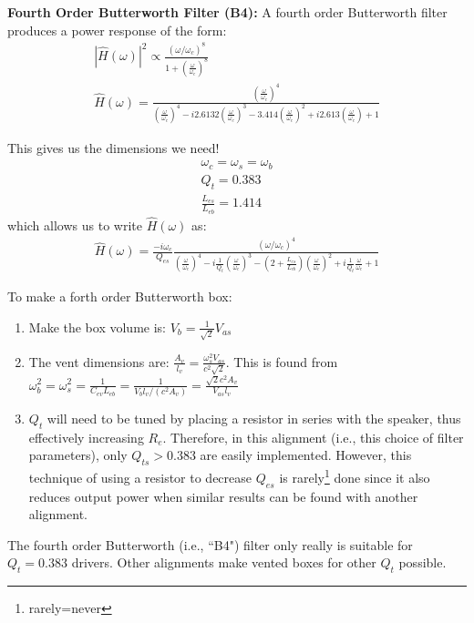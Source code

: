 \documentclass[10pt,letterpaper]{book}
\begin{document}
\textbf{Fourth Order Butterworth Filter (B4):} A fourth order Butterworth filter produces a power response of the form:
\begin{align}
\left|  \hat{H}(\omega) \right|^2\propto \frac{(\omega/\omega_c)^8}{1+\left(\frac{\omega}{\omega_c}\right)^8}\label{eq:transfer_func}\\
\hat{H}(\omega)=\frac{(\frac{\omega}{\omega_c})^4}{(\frac{\omega}{\omega_c})^4-i2.6132(\frac{\omega}{\omega_c})^3-3.414(\frac{\omega}{\omega_c})^2+i2.613(\frac{\omega}{\omega_c})+1}
\end{align}

This gives us the dimensions we need!
\begin{align}
\omega_c=\omega_s=\omega_b\\
Q_t=0.383\\
\frac{L_{es}}{L_{eb}}=1.414
\end{align}
which allows us to write $\hat{H}(\omega)$ as:
\begin{align}
\hat{H}(\omega)=\frac{-i\omega_c}{Q_{es}}\frac{(\omega/\omega_c)^4}
{\left(\frac{\omega}{\omega_c}\right)^4-i\frac{1}{Q_t}\left(\frac{\omega}{\omega_c}\right)^3-\left(2+\frac{L_{es}}{L_{eb}}\right)\left(\frac{\omega}{\omega_c}\right)^2+i\frac{1}{Q_t}\frac{\omega}{\omega_c}+1}
\end{align}

To make a forth order Butterworth box:
\begin{enumerate}
\item Make the box volume is: $V_b=\frac{1}{\sqrt{2}}V_{as}$
\item The vent dimensions are: $\frac{A_v}{l_v}=\frac{\omega_s^2 V_{as}}{c^2\sqrt{2}}$. This is found from $\omega_b^2=\omega_s^2=\frac{1}{C_{ev}L_{eb}}=\frac{1}{V_b l_v/(c^2 A_v)}=\frac{\sqrt{2}c^2 A_v}{V_{as}l_v}$
\item $Q_t$ will need to be tuned by placing a resistor in series with the speaker, thus effectively increasing $R_e$. Therefore, in this alignment (i.e., this choice of filter parameters), only $Q_{ts}>0.383$ are easily implemented. However, this technique of using a resistor to decrease $Q_{es}$ is rarely\footnote{rarely=never} done since it also reduces output power when similar results can be found with another alignment.
\end{enumerate}

The fourth order Butterworth (i.e., ``B4") filter only really is suitable for $Q_t=0.383$ drivers. Other alignments make vented boxes for other $Q_t$ possible.
\end{document}
